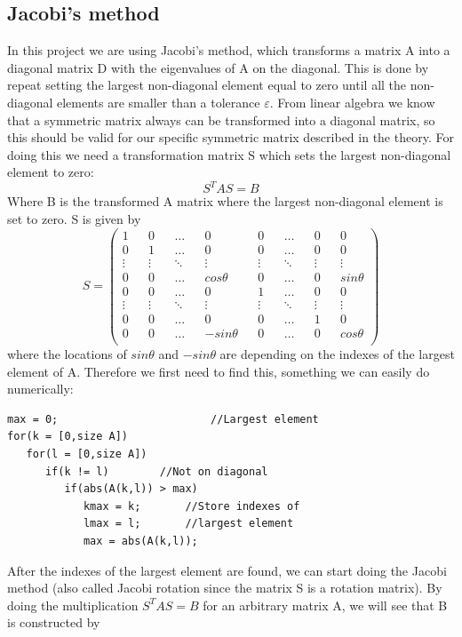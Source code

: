 \documentclass[norsk,a4paper,12pt]{article}
\begin{document}
\subsection{Jacobi's method}
In this project we are using Jacobi's method, which transforms a matrix A into a diagonal matrix D with the eigenvalues of A on the diagonal. This is done by repeat setting the largest non-diagonal element equal to zero until all the non-diagonal elements are smaller than a tolerance $\varepsilon$. From linear algebra we know that a symmetric matrix always can be transformed into a diagonal matrix, so this should be valid for our specific symmetric matrix described in the theory. For doing this we need a transformation matrix S which sets the largest non-diagonal element to zero:
\begin{equation}
S^T A S=B
\end{equation}
Where B is the transformed A matrix where the largest non-diagonal element is set to zero. S is given by
\setcounter{MaxMatrixCols}{20}
\begin{equation}
S=\begin{pmatrix} 
1	&&0	&&\hdots		&&0		&&0	&&\hdots	&&0 	&&0\\
0	&&1		&&\hdots&&0&&0&&\hdots&&0&&0\\ \vdots&&\vdots&&\ddots&&\vdots&&\vdots&&\ddots&&\vdots&&\vdots\\ 0&&0&&\hdots&&cos\theta&&0&&\hdots&&0&&sin\theta\\
0&&0&&\hdots&&0&&1&&\hdots&&0&&0\\ \vdots&&\vdots&&\ddots&&\vdots&&\vdots&&\ddots&&\vdots&&\vdots\\ 0&&0&&\hdots&&0&&0&&\hdots&&1&&0\\
0&&0&&\hdots&&-sin\theta&&0&&\hdots&&0&&cos\theta\\
\end{pmatrix}
\end{equation}
where the locations of $sin\theta$ and $-sin\theta$ are depending on the indexes of the largest element of A. Therefore we first need to find this, something we can easily do numerically:
\begin{lstlisting}
max = 0;                     	//Largest element
for(k = [0,size A])
   for(l = [0,size A])
      if(k != l)		//Not on diagonal
         if(abs(A(k,l)) > max)
            kmax = k;		//Store indexes of
            lmax = l;		//largest element
            max = abs(A(k,l));
\end{lstlisting}
After the indexes of the largest element are found, we can start doing the Jacobi method (also called Jacobi rotation since the matrix S is a rotation matrix). By doing the multiplication $S^T AS = B$ for an arbitrary matrix A, we will see that B is constructed by
\end{document}
